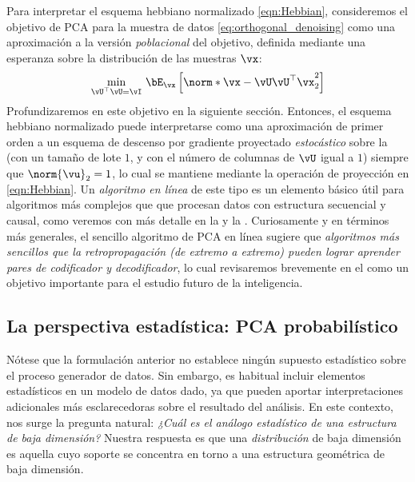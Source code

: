 \documentclass[../../book-main.tex]{subfiles}
\begin{document}
Para interpretar el esquema hebbiano normalizado \eqref{eqn:Hebbian}, consideremos
el objetivo de PCA para la muestra de datos \eqref{eq:orthogonal_denoising} como una
aproximación a la versión \textit{poblacional} del objetivo, definida mediante
una esperanza sobre la distribución de las muestras $\vx$:
\begin{equation}\label{eq:pca-reconstruction-expectation}
    \min_{\vU^\top \vU = \vI}\, \bE_{\vx}\left[\norm*{\vx
    - \vU\vU^\top \vx}_2^2\right]
\end{equation}
Profundizaremos en este objetivo en la siguiente sección. Entonces, 
el esquema hebbiano normalizado puede interpretarse como
una aproximación de primer orden a un esquema de descenso por gradiente proyectado
\textit{estocástico} sobre la  (con un 
tamaño de lote $1$, y con el número de columnas de $\vU$ igual a $1$) siempre que
$\norm{\vu}_2 = 1$, lo cual se mantiene mediante la operación de proyección en
\eqref{eqn:Hebbian}. Un \textit{algoritmo en línea} de este tipo es un elemento 
básico útil para algoritmos más complejos que que procesan datos con estructura 
secuencial y causal, como veremos con más detalle en la  y
la . Curiosamente y en términos más generales, el sencillo
algoritmo de PCA en línea sugiere que \textit{algoritmos más sencillos que la 
retropropagación (de extremo a extremo) pueden lograr aprender pares de 
codificador y decodificador}, lo cual revisaremos brevemente en el  
como un objetivo importante para el estudio futuro de la inteligencia.

\subsection{La perspectiva estadística: PCA probabilístico}
\label{subsec:probabilistic PCA}

Nótese que la formulación anterior no establece ningún supuesto estadístico sobre el
proceso generador de datos. Sin embargo, es habitual incluir elementos estadísticos
en un modelo de datos dado, ya que pueden aportar interpretaciones adicionales más esclarecedoras
sobre el resultado del análisis. En este contexto, nos surge la pregunta natural:
\textit{¿Cuál es el análogo estadístico de una estructura de baja dimensión?}
Nuestra respuesta es que una \textit{distribución} de baja dimensión es aquella 
cuyo soporte se concentra en torno a una estructura geométrica de baja dimensión.
\end{document}
